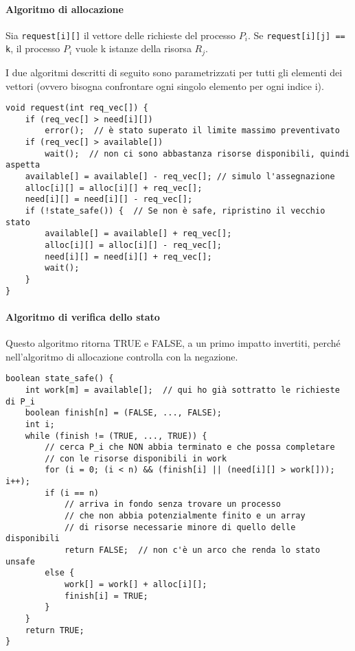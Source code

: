 \documentclass[a4]{article}
\begin{document}
\paragraph{Algoritmo di allocazione}
Sia \verb|request[i][]| il vettore delle richieste del processo $P_i$. Se \verb|request[i][j] == k|, il processo $P_i$ vuole k istanze della risorsa $R_j$. 

I due algoritmi descritti di seguito sono parametrizzati per tutti gli elementi dei vettori (ovvero bisogna confrontare ogni singolo elemento per ogni indice i).
\begin{Verbatim}[tabsize=4]
void request(int req_vec[]) {
    if (req_vec[] > need[i][])
        error();  // è stato superato il limite massimo preventivato
    if (req_vec[] > available[])
        wait();  // non ci sono abbastanza risorse disponibili, quindi aspetta
    available[] = available[] - req_vec[]; // simulo l'assegnazione
    alloc[i][] = alloc[i][] + req_vec[];
    need[i][] = need[i][] - req_vec[];
    if (!state_safe()) {  // Se non è safe, ripristino il vecchio stato
        available[] = available[] + req_vec[];
        alloc[i][] = alloc[i][] - req_vec[];
        need[i][] = need[i][] + req_vec[];
        wait();
    }
}
\end{Verbatim}

\paragraph{Algoritmo di verifica dello stato}
Questo algoritmo ritorna TRUE e FALSE, a un primo impatto invertiti, perché nell'algoritmo di allocazione controlla con la negazione.

\begin{Verbatim}[tabsize=4]
boolean state_safe() {
    int work[m] = available[];  // qui ho già sottratto le richieste di P_i
    boolean finish[n] = (FALSE, ..., FALSE);
    int i;
    while (finish != (TRUE, ..., TRUE)) {
        // cerca P_i che NON abbia terminato e che possa completare
        // con le risorse disponibili in work
        for (i = 0; (i < n) && (finish[i] || (need[i][] > work[])); i++);
        if (i == n)  
            // arriva in fondo senza trovare un processo
            // che non abbia potenzialmente finito e un array
            // di risorse necessarie minore di quello delle disponibili
            return FALSE;  // non c'è un arco che renda lo stato unsafe
        else {
            work[] = work[] + alloc[i][];
            finish[i] = TRUE;
        }
    }
    return TRUE;
}
\end{Verbatim}
\end{document}
